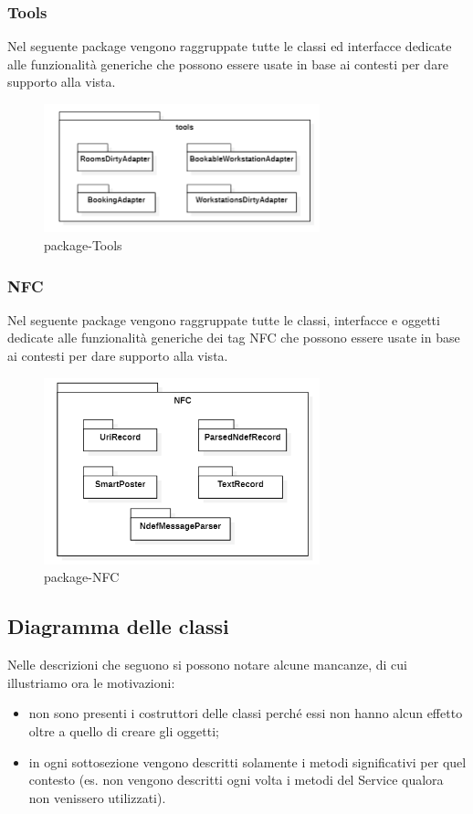 \subsubsection{Tools}
Nel seguente package vengono raggruppate tutte le classi ed interfacce dedicate alle funzionalità generiche che possono essere usate in base ai contesti per dare supporto alla vista.
\begin{figure}[H]
	\centering
	\includegraphics[width=8cm]{res/images/apputenti-packageTools.png}
	\caption{package-Tools}
	\label{fig:package-Tools}
\end{figure}


\subsubsection{NFC}
Nel seguente package vengono raggruppate tutte le classi, interfacce e oggetti dedicate alle funzionalità generiche dei tag NFC che possono essere usate in base ai contesti per dare supporto alla vista.
\begin{figure}[H]
	\centering
	\includegraphics[width=8cm]{res/images/apputenti-packageNFC.png}
	\caption{package-NFC}
	\label{fig:package-NFC}
\end{figure}

\subsection{Diagramma delle classi}
Nelle descrizioni che seguono si possono notare alcune mancanze, di cui illustriamo ora le motivazioni:
\begin{itemize}
	\item non sono presenti i costruttori delle classi perché essi non hanno alcun effetto oltre a quello di creare gli oggetti;
	\item in ogni sottosezione vengono descritti solamente i metodi significativi per quel contesto (es. non vengono descritti ogni volta i metodi del Service qualora non venissero utilizzati).
\end{itemize}

